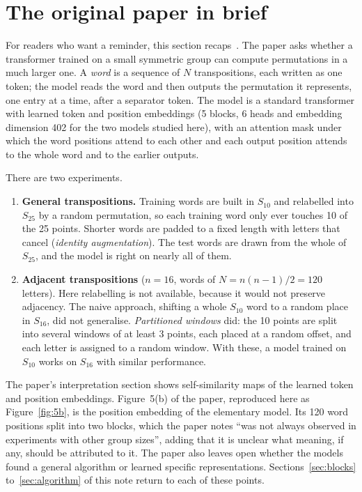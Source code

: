 \documentclass[11pt,a4paper]{article}
\begin{document}
\section{The original paper in brief}\label{sec:recap}

For readers who want a reminder, this section recaps~\cite{paper}. The paper asks whether a transformer trained on a small symmetric group can compute permutations in a much larger one. A \emph{word} is a sequence of $N$ transpositions, each written as one token; the model reads the word and then outputs the permutation it represents, one entry at a time, after a separator token. The model is a standard transformer with learned token and position embeddings (5 blocks, 6 heads and embedding dimension 402 for the two models studied here), with an attention mask under which the word positions attend to each other and each output position attends to the whole word and to the earlier outputs.

There are two experiments.
\begin{enumerate}
  \item \textbf{General transpositions.} Training words are built in $S_{10}$ and relabelled into $S_{25}$ by a random permutation, so each training word only ever touches 10 of the 25 points. Shorter words are padded to a fixed length with letters that cancel (\emph{identity augmentation}). The test words are drawn from the whole of $S_{25}$, and the model is right on nearly all of them.
  \item \textbf{Adjacent transpositions} ($n=16$, words of $N=n(n-1)/2=120$ letters). Here relabelling is not available, because it would not preserve adjacency. The naive approach, shifting a whole $S_{10}$ word to a random place in $S_{16}$, did not generalise. \emph{Partitioned windows} did: the 10 points are split into several windows of at least 3 points, each placed at a random offset, and each letter is assigned to a random window. With these, a model trained on $S_{10}$ works on $S_{16}$ with similar performance.
\end{enumerate}

The paper's interpretation section shows self-similarity maps of the learned token and position embeddings. Figure~5(b) of the paper, reproduced here as Figure~\ref{fig:5b}, is the position embedding of the elementary model. Its 120 word positions split into two blocks, which the paper notes ``was not always observed in experiments with other group sizes'', adding that it is unclear what meaning, if any, should be attributed to it. The paper also leaves open whether the models found a general algorithm or learned specific representations. Sections~\ref{sec:blocks} to~\ref{sec:algorithm} of this note return to each of these points.
\end{document}
